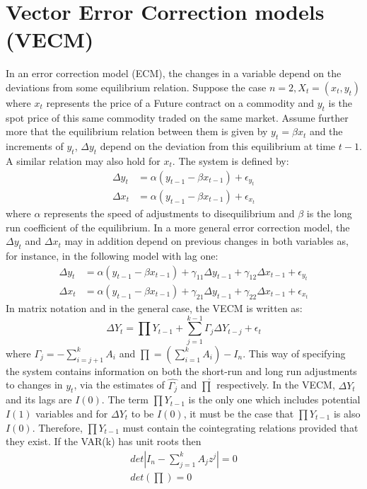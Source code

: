 \documentclass[11pt,a4,twosided,singlespacing,titlepagenumber=on]{scrreprt}
\numberwithin{equation}{chapter} %
\theoremstyle{remark}
\begin{document}
\section{Vector Error Correction models (VECM)}
In an error correction model (ECM), the changes in a variable depend on the deviations from some equilibrium relation. Suppose the case $n=2, X_t = (x_t, y_t)$ where $x_t$ represents the price of a Future contract on a commodity and $y_t$ is the spot price of this same commodity traded on the same market. Assume further more that the equilibrium relation between them is given by $y_t = \beta x_t$ and the increments of $y_t$, $\Delta y_t$ depend on the deviation from this equilibrium at time $t-1$. A similar relation may also hold for $x_t$. The system is defined by:
\begin{align*}
\Delta y_t &= \alpha (y_{t-1} - \beta x_{t-1}) + \epsilon_{y_t} \\
\Delta x_t &= \alpha (y_{t-1} - \beta x_{t-1}) + \epsilon_{x_t}
\end{align*}
where $\alpha$ represents the speed of adjustments to disequilibrium and $\beta$ is the long run coefficient of the equilibrium. In a more general error correction model, the $\Delta y_t$ and $\Delta x_t$ may in addition depend on previous changes in both variables as, for instance, in the following model with lag one:
\begin{align*}
\Delta y_t &= \alpha (y_{t-1} - \beta x_{t-1}) + \gamma_{11} \Delta y_{t-1} + \gamma_{12} \Delta x_{t-1} + \epsilon_{y_t} \\
\Delta x_t &= \alpha (y_{t-1} - \beta x_{t-1}) + \gamma_{21} \Delta y_{t-1} + \gamma_{22} \Delta x_{t-1} + \epsilon_{x_t}
\end{align*}
In matrix notation and in the general case, the VECM is written as:
$$\Delta Y_t = \prod Y_{t-1} + \sum_{j=1}^{k-1} \Gamma_j \Delta Y_{t-j} + \epsilon_t $$
where $\Gamma_j = - \sum_{i=j+1}^k A_i$ and $\prod = \left(\sum_{i=1}^k A_i \right) - I_n$. This way of specifying the system contains information on both the short-run and long run adjustments to changes in $y_t$, via the estimates of $\hat{\Gamma_j}$ and $\hat{\prod}$ respectively. In the VECM, $\Delta Y_t$ and its lags are $I(0)$. The term $\prod Y_{t-1}$ is the only one which includes potential $I(1)$ variables and for $\Delta Y_t$ to be $I(0)$, it must be the case that $\prod Y_{t-1}$ is also $I(0)$. Therefore, $\prod Y_{t-1}$ must contain the cointegrating relations provided that they exist. If the VAR(k) has unit roots then 
\begin{align*}
det |I_n - \sum_{j=1}^k A_j z^j| = 0 \\
det \left(\prod \right) = 0
\end{align*}
\end{document}
